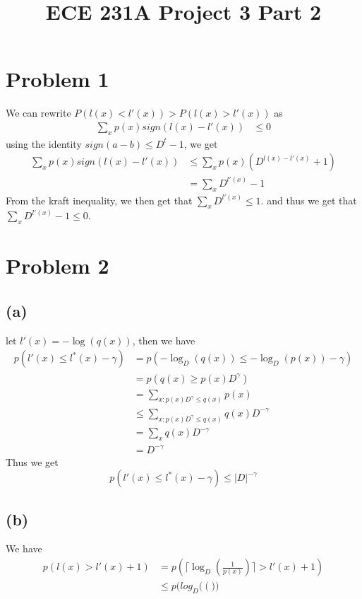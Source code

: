 
\title{ECE 231A Project 3 Part 2}

\maketitle
\section*{Problem 1}
We can rewrite $P(l(x)<l'(x))>P(l(x)>l'(x))$ as
\begin{align*}
    \sum_{x} p(x)sign(l(x)-l'(x))&\leq 0
\end{align*}
using the identity $sign(a-b)\leq D^t-1$, we get
\begin{align*}
    \sum_{x} p(x)sign(l(x)-l'(x))&\leq \sum_{x} p(x)\left(D^{l(x)-l'(x)}+1\right)\\
    &=\sum_{x}D^{l'(x)}-1
\end{align*}
From the kraft inequality, we then get that $\sum_{x}D^{l'(x)}\leq 1$.
and thus we get that $\sum_{x}D^{l'(x)}-1\leq 0$.
\section*{Problem 2}
\subsection*{(a)}
let $l'(x)=-\log(q(x))$, then we have
\begin{align*}
    p(l'(x)\leq l^*(x)-\gamma)&=p(-\log_D(q(x))\leq -\log_D(p(x))-\gamma)\\
    &=p(q(x)\geq p(x)D^{\gamma})\\
    &=\sum_{x:p(x)D^{\gamma}\leq q(x)}p(x)\\
    &\leq \sum_{x:p(x)D^{\gamma}\leq q(x)}q(x)D^{-\gamma}\\
    &=\sum_{x}q(x)D^{-\gamma}\\
    &=D^{-\gamma}
\end{align*} 
Thus we get
$$
    p(l'(x)\leq l^*(x)-\gamma)\leq |D|^{-\gamma}$$   
\subsection*{(b)}
We have 
\begin{align*}
    p(l(x)>l'(x)+1)&=p\left(\lceil \log_D\left(\frac{1}{p(x)}\right)\rceil >l'(x)+1\right)\\
    &\leq p(log_D(\left())
\end{align*}

